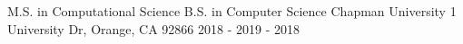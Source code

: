 

\begin{cventries}

  \cventry
    {M.S. in Computational Science \linebreak B.S. in Computer Science} %
    {Chapman University} %
    {1 University Dr, Orange, CA 92866} %
    {2018 - 2019  - 2018} %
    {
    }
\vspace{-0.7cm}
\end{cventries}
